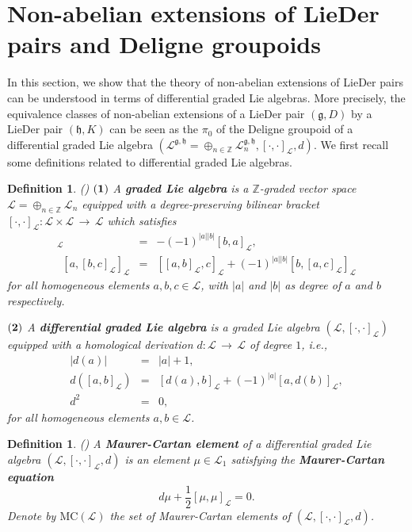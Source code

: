 \documentclass[12pt]{amsart}
\newtheorem{defi}[thm]{Definition}
\newcommand{\lon }{\,\rightarrow\,}
\newcommand{\g}{\mathfrak g}
\newcommand{\h}{\mathfrak h}
\newcommand{\huaL}{\mathcal{L}}
\newcommand{\LD}{{\rm LieDer }}
\begin{document}
\section{Non-abelian extensions of \rm{LieDer} pairs and Deligne groupoids}
In this section,  we show that the theory of non-abelian extensions of \LD pairs can be understood in terms of
differential graded Lie algebras. More precisely, the equivalence classes of non-abelian extensions of a \LD pair $(\g, D)$ by a \LD pair $(\h, K)$ can be seen as the $\pi_0$ of the {\rm Deligne} groupoid of a differential graded Lie algebra $(\huaL^{\g, \h}=\oplus_{n\in\mathbb{Z}}\huaL^{\g, \h}_n, [\cdot, \cdot]_\huaL, d)$.
We first recall some definitions related to differential graded Lie algebras.

\begin{defi}{\rm(\cite{NR})}
${\bf (1)}$ A {\bf graded Lie algebra} is a $\mathbb{Z}$-graded vector space $\huaL=\oplus_{n\in\mathbb{Z}}\huaL_{n}$ equipped with a degree-preserving bilinear bracket $[\cdot,\cdot]_{\huaL}:\huaL\times\huaL\lon\huaL$ which satisfies
\begin{eqnarray*}
    [a,b]_{\huaL}&=&-(-1)^{|a||b|}[b,a]_{\huaL},\\
    ~~[a,[b,c]_{\huaL}]_{\huaL}&=&[[a,b]_{\huaL},c]_{\huaL}+(-1)^{|a||b|}[b,[a,c]_{\huaL}]_{\huaL}
\end{eqnarray*}
for all homogeneous elements $a,b,c\in \huaL$, with $|a|$ and $|b|$ as degree of $a$ and $b$ respectively. 

${\bf (2)}$ A {\bf differential graded Lie algebra} is a graded Lie algebra $(\huaL,[\cdot,\cdot]_{\huaL})$ equipped with a homological derivation $d:\huaL\lon\huaL$ of degree $1$, i.e.,
    \begin{eqnarray*}
        |d(a)|&=&|a|+1,\\
        d([a,b]_{\huaL})&=&[d(a),b]_{\huaL}+(-1)^{|a|}[a,d(b)]_{\huaL},\\
        d^{2}&=&0,
    \end{eqnarray*}
    for all homogeneous elements $a,b\in\huaL$.
\end{defi}
\begin{defi}{\rm(\cite{NR})}
A {\bf Maurer-Cartan element} of a differential graded Lie algebra $(\huaL,[\cdot,\cdot]_{\huaL},d)$ is an element $\mu\in \huaL_{1}$ satisfying the {\bf Maurer-Cartan equation}
\begin{equation}
    d\mu+\frac{1}{2}[\mu,\mu]_{\huaL}=0.
\end{equation}
Denote by $\mathrm{MC}(\huaL)$ the set of {\rm Maurer-Cartan} elements of $(\huaL,[\cdot,\cdot]_{\huaL},d)$.
\end{defi}
\end{document}
